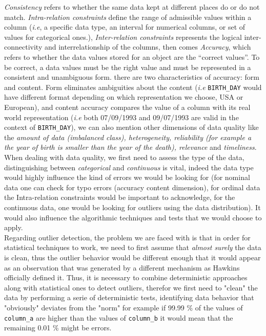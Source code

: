 \documentclass{article}
\begin{document}
\textit{Consistency} refers to whether the same data kept at different places do or do not match. \textit{Intra-relation constraints} define the range of admissible values within a column (\textit{i.e}, a specific data type, an interval for numerical columns, or set of values for categorical ones.), \textit{Inter-relation constraints} represents the logical inter-connectivity and interrelationship of the columns, then comes \textit{Accuracy}, which refers to whether the data values stored for an object are the ``correct values''. To be correct, a data values must be the right value and must be represented in a consistent and unambiguous form. there are two characteristics of accuracy: form and content. Form eliminates ambiguities about the content (\textit{i.e} \texttt{BIRTH\_DAY} would have different format depending on which representation we choose, USA or European), and content accuracy compares the value of a column with its real world representation (\textit{i.e} both 07/09/1993 and 09/07/1993 are valid in the context of \texttt{BIRTH\_DAY}), we can also mention other dimensions of data quality like the \textit{amount of data (imbalanced class), heterogeneity, reliability (for example a the year of birth is smaller than the year of the death), relevance} and \textit{timeliness}. \\
When dealing with data quality, we first need to assess the type of the data, distinguishing between \textit{categorical} and \textit{continuous} is vital, indeed the data type would highly influence the kind of errors we would be looking for (for nominal data one can check for typo errors (accuracy content dimension), for ordinal data the Intra-relation constraints would be important to acknowledge, for the continuous data, one would be looking for outliers using the data distribution). It would also influence the algorithmic techniques and tests that we would choose to apply. \\

Regarding outlier detection, the problem we are faced with is that in order for statistical techniques to work, we need to first assume that \textit{almost surely} the data is clean, thus the outlier behavior would be different enough that it would appear as an observation that was generated by a different mechanism as Hawkins officially defined it. Thus, it is necessary to combine deterministic approaches along with statistical ones to detect outliers, therefor we first need to "clean" the data by performing a serie of deterministic tests, identifying data behavior that "obviously"
deviates from the "norm" for example if 99.99 \% of the values of \texttt{column\_a} are higher than the values of \texttt{column\_b} it would mean that the remaining 0.01 \% might be errors.\\
\end{document}
